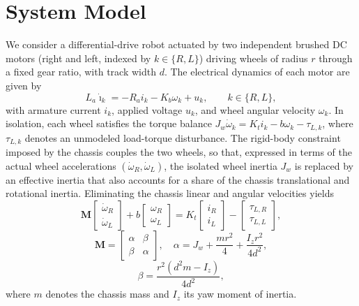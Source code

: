 \documentclass[letterpaper, 10 pt, conference]{ieeeconf}
\begin{document}
\section{System Model}
\label{sec:model}
We consider a differential-drive robot actuated by two independent brushed DC motors (right and left, indexed by $k\in\{R,L\}$) driving wheels of radius $r$ through a fixed gear ratio, with track width $d$. The electrical dynamics of each motor are given by
\begin{equation}
L_a\dot\imath_k = -R_ai_k-K_b\omega_k+u_k, \qquad k\in\{R,L\},
\label{eq:elec}
\end{equation}
with armature current $i_k$, applied voltage $u_k$, and wheel angular velocity $\omega_k$. In isolation, each wheel satisfies the torque balance $J_w\dot\omega_k=K_ti_k-b\omega_k-\tau_{L,k}$, where $\tau_{L,k}$ denotes an unmodeled load-torque disturbance. The rigid-body constraint imposed by the chassis couples the two wheels, so that, expressed in terms of the actual wheel accelerations $(\dot\omega_R,\dot\omega_L)$, the isolated wheel inertia $J_w$ is replaced by an effective inertia that also accounts for a share of the chassis translational and rotational inertia. Eliminating the chassis linear and angular velocities yields
\begin{equation}
\mathbf{M}\begin{bmatrix}\dot\omega_R\\\dot\omega_L\end{bmatrix}+b\begin{bmatrix}\omega_R\\\omega_L\end{bmatrix}=K_t\begin{bmatrix}i_R\\i_L\end{bmatrix}-\begin{bmatrix}\tau_{L,R}\\\tau_{L,L}\end{bmatrix},
\label{eq:mech}
\end{equation}
\begin{equation}
\mathbf{M}=\begin{bmatrix}\alpha&\beta\\\beta&\alpha\end{bmatrix}, \quad
\alpha=J_w+\frac{mr^2}{4}+\frac{I_zr^2}{4d^2},
\label{eq:Mmatrix}
\end{equation}
\begin{equation}
\beta=\frac{r^2(d^2m-I_z)}{4d^2},
\label{eq:beta}
\end{equation}
where $m$ denotes the chassis mass and $I_z$ its yaw moment of inertia.
\end{document}
